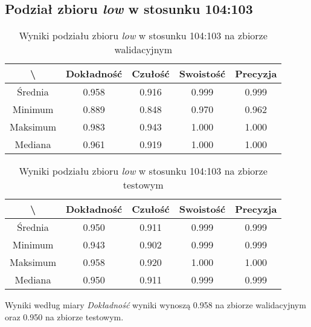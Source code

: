\subsection{Podział zbioru \textit{low} w stosunku 104:103}


\begin{table}[H]
	\centering
	\caption{Wyniki podziału zbioru \textit{low} w stosunku 104:103 na zbiorze walidacyjnym}
	\vspace{6pt}
	{\footnotesize
		\begin{tabular}{|c|c|c|c|c|}
      \hline \textbackslash & Dokładność & Czułość & Swoistość & Precyzja \\
      \hline Średnia & 0.958 & 0.916 & 0.999 & 0.999 \\
      \hline Minimum & 0.889 & 0.848 & 0.970 & 0.962 \\
      \hline Maksimum & 0.983 & 0.943 & 1.000 & 1.000 \\
      \hline Mediana & 0.961 & 0.919 & 1.000 & 1.000 \\
      \hline
    \end{tabular}
    \label{Tab:lowsplitd_val}
	}
	\vspace{0pt}
\end{table}

\begin{table}[H]
	\centering
	\caption{Wyniki podziału zbioru \textit{low} w stosunku 104:103 na zbiorze testowym}
	\vspace{6pt}
	{\footnotesize
		\begin{tabular}{|c|c|c|c|c|}
      \hline \textbackslash & Dokładność & Czułość & Swoistość & Precyzja \\
      \hline Średnia & 0.950 & 0.911 & 0.999 & 0.999 \\
      \hline Minimum & 0.943 & 0.902 & 0.999 & 0.999 \\
      \hline Maksimum & 0.958 & 0.920 & 1.000 & 1.000 \\
      \hline Mediana & 0.950 & 0.911 & 0.999 & 0.999 \\
      \hline
    \end{tabular}
    \label{Tab:lowsplitd_test}
	}
	\vspace{0pt}
\end{table}

Wyniki według miary \textit{Dokładność} wyniki wynoszą 0.958 na zbiorze walidacyjnym oraz 0.950 na zbiorze testowym.

